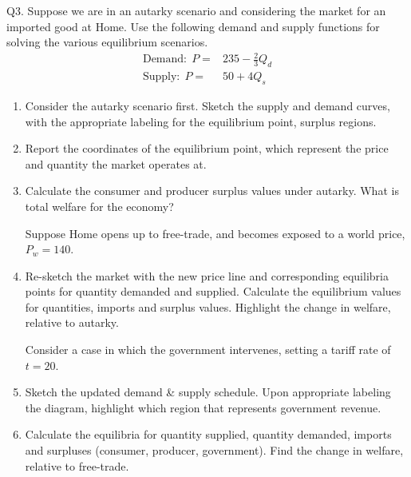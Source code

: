 \documentclass[12pt]{article}
\begin{document}
\newpage


\noindent Q3. Suppose we are in an autarky scenario and considering the market for an imported good at Home. 
Use the following demand and supply functions for solving the various equilibrium scenarios.
\begin{align*}
\text{Demand:} \ \  P = & 235 - \frac{2}{3} Q_d\\
\text{Supply:}\ \  P = & 50  + 4 Q_s
\end{align*}

\begin{enumerate}[1)]
	\item Consider the autarky scenario first. Sketch the supply and demand curves, with the appropriate labeling for the equilibrium point, surplus regions.
	
	\vspace{3in}
	
	\item Report the coordinates of the equilibrium point, which represent the price and quantity the market operates at.
	
	\vspace{1in}
	
	
	\newpage
	
	\item Calculate the consumer and producer surplus values under autarky.  What is total welfare for the economy?
	
	\vspace{1.4in}
	
	\noindent Suppose Home opens up to free-trade, and becomes exposed to a world price, $P_w = 140$. 
	
	\item Re-sketch the market with the new price line and corresponding equilibria points for quantity demanded and supplied. 
	Calculate the equilibrium values for quantities, imports and surplus values. 
	Highlight the change in welfare, relative to autarky. 
	
	\vspace{4in}
	
	\newpage
	
	\noindent Consider a case in which the government intervenes, setting a tariff rate of $t=20$. 
	
	\item Sketch the updated demand \& supply schedule. Upon appropriate labeling the diagram, highlight which region that represents government revenue.
	
	\vspace{3.5in}
	
	\item Calculate the equilibria for quantity supplied, quantity demanded, imports and surpluses (consumer, producer, government). 
	Find the change in welfare, relative to free-trade. 
	
	\vspace{2in}
	
\end{enumerate}
\end{document}
